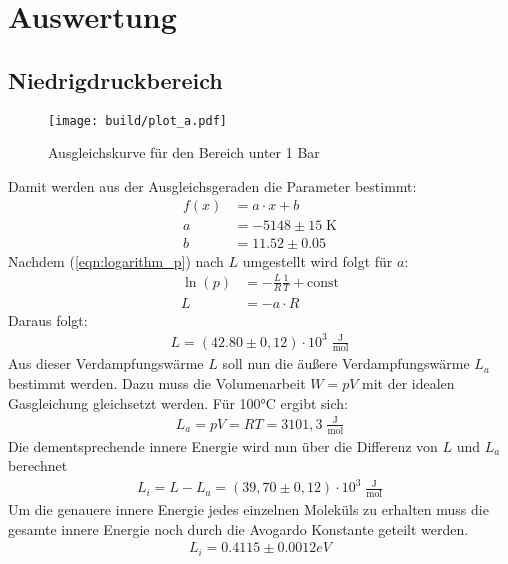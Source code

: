 \section{Auswertung}
\label{sec:Auswertung}
\subsection{Niedrigdruckbereich}
\begin{figure}
    \centering
    \texttt{[image: build/plot\_a.pdf]}
    \caption{Ausgleichskurve für den Bereich unter 1 Bar}
    \label{fig:Niedrigdruck}
\end{figure}
Damit werden aus der Ausgleichsgeraden die Parameter bestimmt:
\begin{align*}
    f(x) &= a\cdot x + b \\
    a &= -5148 \pm 15 \; \text{K}\\
    b &= 11.52 \pm 0.05
\end{align*}
Nachdem (\ref{eqn:logarithm_p}) nach $L$ umgestellt wird folgt für $a$:
\begin{align*}
    \ln(p) &= -\frac{L}{R}\frac{1}{T}+\text{const} \\ L &= -a\cdot R
\end{align*}
Daraus folgt:
\begin{align*}
    L = (42.80\pm 0,12)\cdot 10^3 \; \frac{\text{J}}{\text{mol}}
\end{align*}
Aus dieser Verdampfungswärme $L$ soll nun die äußere Verdampfungswärme $L_a$ bestimmt werden.
Dazu muss die Volumenarbeit $W = pV$ mit der idealen Gasgleichung gleichsetzt werden.
Für 100°C ergibt sich:
\begin{align*}
    L_a = pV = RT = 3101,3 \; \frac{\text{J}}{\text{mol}}
\end{align*}
Die dementsprechende innere Energie wird nun über die Differenz von $L$ und $L_a$ berechnet
\begin{align*}
    L_i = L - L_a = (39,70\pm0,12)\cdot 10^3 \; \frac{\text{J}}{\text{mol}}
\end{align*}
Um die genauere innere Energie jedes einzelnen Moleküls zu erhalten muss die gesamte innere Energie noch durch die Avogardo Konstante geteilt werden.
\begin{align*}
    L_i = 0.4115\pm 0.0012 eV
\end{align*}
